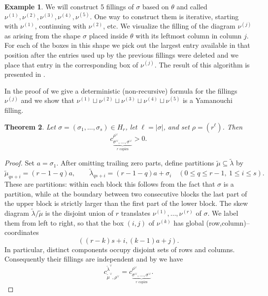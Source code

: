 \documentclass[11pt, reqno]{amsart}
\numberwithin{equation}{section}
\newtheorem{theorem}{Theorem}[section]
\theoremstyle{definition}
\newtheorem{example}[theorem]{Example}
\newcommand{\s}{\sigma}
\begin{document}
\begin{appendix}
\begin{example}
We will construct 5 fillings of $\s$ based on $\theta$ and called  $\nu^{(1)},\nu^{(2)},\nu^{(3)},
\nu^{(4)},\nu^{(5)}$. One way to construct them is iterative, starting with $\nu^{(1)}$, continuing with $\nu^{(2)}$, etc. We visualize the filling of the diagram $\nu^{(j)}$ as arising from the  shape $\s$ placed inside $\theta$ with its leftmost column in column $j$. For each of the boxes in this shape we pick out the largest entry available in that position after the entries used up by the previous fillings were deleted and we place that entry in the corresponding box of $\nu^{(j)}$. The result of this algorithm is presented in .

In the proof of  we give a deterministic (non-recursive) formula for the fillings $\nu^{(j)}$ and we show that $\nu^{(1)}\sqcup\nu^{(2)}\sqcup\nu^{(3)}
    \sqcup\nu^{(4)}\sqcup\nu^{(5)}$ is a Yamanouchi filling.
\end{example}

\begin{theorem}\label{thm: rectangle corrected}
Let $\sigma=(\sigma_1,\ldots,\sigma_s)\in H_r$, let
$\ell=|\sigma|$, and set $\rho=(r^\ell)$.  Then
\[
c_{\underbrace{\scriptstyle\sigma^\vee,\ldots,\sigma^\vee}_{r\text{ copies}}}^{\rho^\vee}>0.
\]
\end{theorem}

\begin{proof}
Set $a=\sigma_1$.  After omitting trailing zero parts, define partitions
$\widetilde\mu\subseteq\widetilde\lambda$ by
\begin{equation}\label{eq: corrected tilde partitions}
 \widetilde\mu_{qs+i}=(r-1-q)a,
 \qquad
 \widetilde\lambda_{qs+i}=(r-1-q)a+\sigma_i
 \quad
 (0\leq q\leq r-1,\ 1\leq i\leq s).
\end{equation}
These are partitions: within each block this follows from the fact that
$\sigma$ is a partition, while at the boundary between two consecutive blocks
the last part of the upper block is strictly larger than the first part of the
lower block.  The skew diagram $\widetilde\lambda/\widetilde\mu$ is the disjoint
union of $r$ translates $\nu^{(1)},\ldots,\nu^{(r)}$ of $\sigma$.  We label them
from left to right, so that the box $(i,j)$ of $\nu^{(k)}$ has global (row,column)--coordinates
\[
 ((r-k)s+i,(k-1)a+j).
\]
In particular, distinct components occupy disjoint sets of rows and columns.
Consequently their fillings are independent and by  \cite[Proposition 9]{Zelevinsky} we have
\begin{equation}\label{eq: corrected multiple to ordinary LR}
c_{\widetilde\mu^\vee,\rho^\vee}^{\widetilde\lambda^\vee}
=c_{\underbrace{\scriptstyle\sigma^\vee,\ldots,\sigma^\vee}_{r\text{ copies}}}^{\rho^\vee}.
\end{equation}


\end{proof}
\end{appendix}
\end{document}
